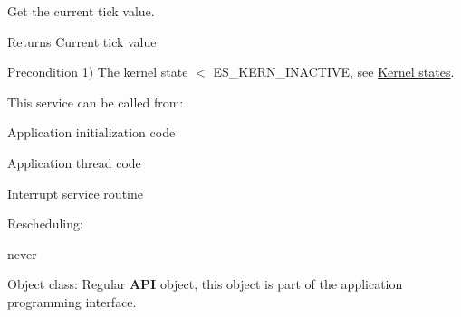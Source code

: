 Get the current tick value. 

\begin{DoxyReturn}{Returns}
Current tick value 
\end{DoxyReturn}
\begin{DoxyPrecond}{Precondition}
1) {\ttfamily The kernel state $<$ E\-S\-\_\-\-K\-E\-R\-N\-\_\-\-I\-N\-A\-C\-T\-I\-V\-E}, see \hyperlink{states}{Kernel states}. 
\end{DoxyPrecond}
\begin{DoxyParagraph}{This service can be called from\-:}

\begin{DoxyItemize}
\item Application initialization code
\item Application thread code
\item Interrupt service routine 
\end{DoxyItemize}
\end{DoxyParagraph}
\begin{DoxyParagraph}{Rescheduling\-:}

\begin{DoxyItemize}
\item never 
\end{DoxyItemize}
\end{DoxyParagraph}
\begin{DoxyParagraph}{Object class\-:}
Regular {\bfseries A\-P\-I} object, this object is part of the application programming interface. 
\end{DoxyParagraph}
